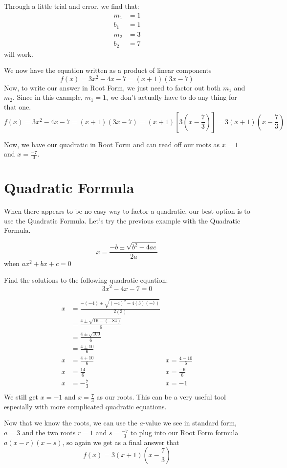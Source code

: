 \documentclass{ximera}
\begin{document}
\begin{example}
\begin{explanation}
Through a little trial and error, we find that:
\begin{align*}
m_1&=1\\
b_1 &=1\\
m_2&=3\\
b_2&=7
\end{align*}
will work.

We now have the equation written as a product of linear components
\[
f(x)= 3x^2-4x-7=(x+1)(3x-7)
\]
Now, to write our answer in Root Form, we just need to factor out both $m_1$ and $m_2$.  Since in this example, $m_1=1$, we don't actually have to do any thing for that one.
\[
f(x)= 3x^2-4x-7=(x+1)(3x-7)=(x+1)\left[3\left(x-\frac{7}{3}\right)\right]=3(x+1)\left(x-\frac{7}{3}\right)
\]
\end{explanation}
Now, we have our quadratic in Root Form and can read off our roots as $x=1$ and $x=\frac{-7}{3}$.
\end{example}

\section{Quadratic Formula}
When there appears to be no easy way to factor a quadratic, our best option is to use the Quadratic Formula. Let's try the previous example with the Quadratic Formula.
\begin{callout}
\[
x=\frac{-b\pm \sqrt{b^2-4ac}}{2a}
\]
when $ax^2+bx+c =0$
\end{callout}
\begin{example}
Find the solutions to the following quadratic equation:
\[
3x^2-4x-7=0
\]
\begin{explanation}
\begin{align*}
x&=\frac{-(-4)\pm \sqrt{(-4)^2-4(3)(-7)}}{2(3)}\\
&=\frac{4 \pm \sqrt{16-(-84)}}{6}\\
&=\frac{4 \pm \sqrt{100}}{6}\\
&=\frac{4 \pm 10}{6}\\
x&=\frac{4+10}{6}&x=\frac{4-10}{6}\\
x&=\frac{14}{6}&x=\frac{-6}{6}\\
x&=-\frac{7}{3}&x=-1\\
\end{align*}
We still get $x=-1$ and $x=\frac{7}{3}$ as our roots. This can be a very useful tool especially with more complicated quadratic equations.

Now that we know the roots, we can use the $a$-value we see in standard form, $a=3$ and the two roots $r=1$ and $s=\frac{-7}{3}$ to plug into our Root Form formula $a(x-r)(x-s)$, so again we get as a final answer that
\[
f(x)=3(x+1)\left(x-\frac{7}{3}\right)
\]
\end{explanation}
\end{example}
\end{document}

